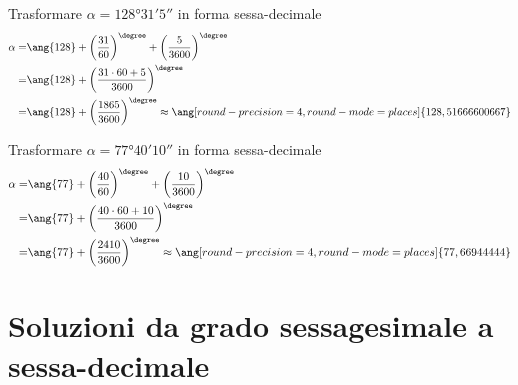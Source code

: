   \begin{exercise}
  	Trasformare  $\alpha=\ang{128;31;5}$ in forma sessa-decimale
  	\tcblower
  	\begin{align*}
  	\alpha=&\ang{128}+\left(\dfrac{31}{60}\right)^{\degree }+\left(\dfrac{5}{3600}\right)^{\degree }\\
  	=&\ang{128}+\left(\dfrac{31\cdot60+5}{3600}\right)^{\degree}\\
  	=&\ang{128}+\left(\dfrac{1865}{3600}\right)^{\degree}\approx\ang[round-precision=\lungarrotandamento,round-mode=places]{128,51666600667}
  	\end{align*}
  \end{exercise}
  \begin{exercise}
  	Trasformare  $\alpha=\ang{77;40;10}$ in forma sessa-decimale
  	\tcblower
  	\begin{align*}
  	\alpha=&\ang{77}+\left(\dfrac{40}{60}\right)^{\degree }+\left(\dfrac{10}{3600}\right)^{\degree }\\
  	=&\ang{77}+\left(\dfrac{40\cdot60+10}{3600}\right)^{\degree}\\
  	=&\ang{77}+\left(\dfrac{2410}{3600}\right)^{\degree}\approx\ang[round-precision=\lungarrotandamento,round-mode=places]{77,66944444}
  	\end{align*}
  \end{exercise}
\tcbstoprecording
\newpage
\section{Soluzioni da grado sessagesimale a sessa-decimale}
\tcbinputrecords
